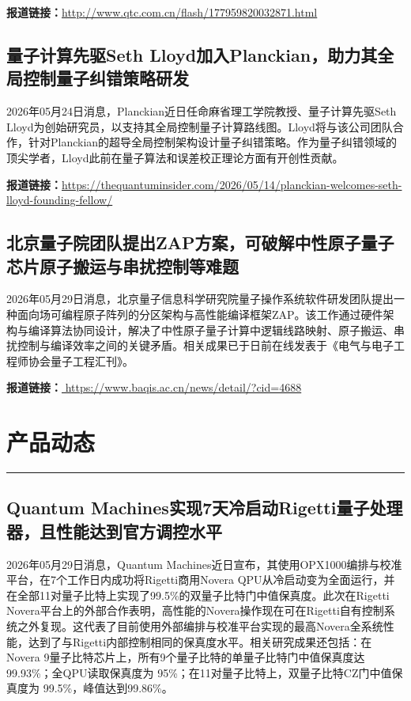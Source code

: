 \documentclass[12pt,a4paper]{ctexart}
\begin{document}
\noindent\textbf{报道链接：}\url{http://www.qtc.com.cn/flash/177959820032871.html }

\subsection{ 量子计算先驱Seth Lloyd加入Planckian，助力其全局控制量子纠错策略研发 }

2026年05月24日消息，Planckian近日任命麻省理工学院教授、量子计算先驱Seth Lloyd为创始研究员，以支持其全局控制量子计算路线图。Lloyd将与该公司团队合作，针对Planckian的超导全局控制架构设计量子纠错策略。作为量子纠错领域的顶尖学者，Lloyd此前在量子算法和误差校正理论方面有开创性贡献。

\noindent\textbf{报道链接：}\url{https://thequantuminsider.com/2026/05/14/planckian-welcomes-seth-lloyd-founding-fellow/ }

\subsection{ 北京量子院团队提出ZAP方案，可破解中性原子量子芯片原子搬运与串扰控制等难题 }

2026年05月29日消息，北京量子信息科学研究院量子操作系统软件研发团队提出一种面向场可编程原子阵列的分区架构与高性能编译框架ZAP。该工作通过硬件架构与编译算法协同设计，解决了中性原子量子计算中逻辑线路映射、原子搬运、串扰控制与编译效率之间的关键矛盾。相关成果已于日前在线发表于《电气与电子工程师协会量子工程汇刊》。

\noindent\textbf{报道链接：}\url{ https://www.baqis.ac.cn/news/detail/?cid=4688 }

\newpage
\section{产品动态}
\vspace{-0.5em}
\noindent\rule{\linewidth}{1.5pt}

\subsection{ Quantum Machines实现7天冷启动Rigetti量子处理器，且性能达到官方调控水平 }

2026年05月29日消息，Quantum Machines近日宣布，其使用OPX1000编排与校准平台，在7个工作日内成功将Rigetti商用Novera QPU从冷启动变为全面运行，并在全部11对量子比特上实现了99.5\%的双量子比特门中值保真度。此次在Rigetti Novera平台上的外部合作表明，高性能的Novera操作现在可在Rigetti自有控制系统之外复现。这代表了目前使用外部编排与校准平台实现的最高Novera全系统性能，达到了与Rigetti内部控制相同的保真度水平。相关研究成果还包括：在Novera 9量子比特芯片上，所有9个量子比特的单量子比特门中值保真度达99.93\%；全QPU读取保真度为 95\%；在11对量子比特上，双量子比特CZ门中值保真度为 99.5\%，峰值达到99.86\%。
\end{document}
